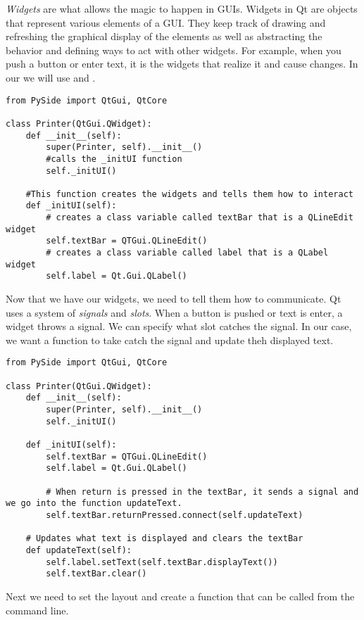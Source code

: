\emph{Widgets} are what allows the magic to happen in GUIs.
Widgets in Qt are objects that represent various elements of a GUI.
They keep track of drawing and refreshing the graphical display of the elements as well as abstracting the behavior and defining ways to act with other widgets.
For example, when you push a button or enter text, it is the widgets that realize it and cause changes.
In our  we will use  and .

\begin{lstlisting}
from PySide import QtGui, QtCore

class Printer(QtGui.QWidget):
	def __init__(self):
		super(Printer, self).__init__() 
		#calls the _initUI function
		self._initUI()
	
	#This function creates the widgets and tells them how to interact
	def _initUI(self): 
		# creates a class variable called textBar that is a QLineEdit widget 
		self.textBar = QTGui.QLineEdit()
		# creates a class variable called label that is a QLabel widget
		self.label = Qt.Gui.QLabel()

\end{lstlisting}

Now that we have our widgets, we need to tell them how to communicate.
Qt uses a system of \emph{signals} and \emph{slots}.
When a button is pushed or text is enter, a widget throws a signal.
We can specify what slot catches the signal.
In our case, we want a function to take catch the signal and update theh displayed text.

\begin{lstlisting}
from PySide import QtGui, QtCore

class Printer(QtGui.QWidget):
	def __init__(self):
		super(Printer, self).__init__() 
		self._initUI()

	def _initUI(self): 
		self.textBar = QTGui.QLineEdit()
		self.label = Qt.Gui.QLabel()
		
		# When return is pressed in the textBar, it sends a signal and we go into the function updateText.
		self.textBar.returnPressed.connect(self.updateText)
	
	# Updates what text is displayed and clears the textBar	
	def updateText(self):
		self.label.setText(self.textBar.displayText())
		self.textBar.clear()

\end{lstlisting}

Next we need to set the layout and create a function that can be called from the command line.


